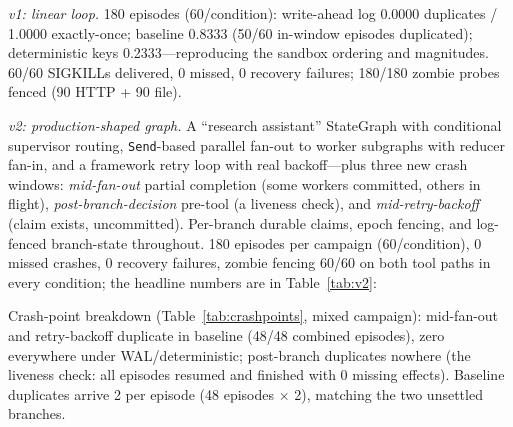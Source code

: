 \documentclass[10pt,journal,compsoc]{IEEEtran}
\begin{document}
\emph{v1: linear loop.} 180 episodes (60/condition):
write-ahead log 0.0000 duplicates / 1.0000 exactly-once;
baseline 0.8333 (50/60 in-window episodes duplicated);
deterministic keys 0.2333---reproducing the sandbox ordering
and magnitudes. 60/60 SIGKILLs delivered, 0 missed, 0 recovery
failures; 180/180 zombie probes fenced (90 HTTP + 90 file).

\emph{v2: production-shaped graph.} A ``research assistant''
StateGraph with conditional supervisor routing, \texttt{Send}-based
parallel fan-out to worker subgraphs with reducer fan-in, and a
framework retry loop with real backoff---plus three new crash
windows: \emph{mid-fan-out} partial completion (some workers
committed, others in flight), \emph{post-branch-decision} pre-tool
(a liveness check), and \emph{mid-retry-backoff} (claim exists,
uncommitted). Per-branch durable claims, epoch fencing, and
log-fenced branch-state throughout. 180 episodes per campaign
(60/condition), 0 missed crashes, 0 recovery failures, zombie
fencing 60/60 on both tool paths in every condition; the
headline numbers are in Table~\ref{tab:v2}:

\begin{table}[ht]
\centering
\caption{LangGraph v2: duplicate / exactly-once rates
(60 episodes/condition). Zero observed duplicates corresponds
to a one-sided exact 95\% upper bound of 4.87\% per condition.}
\label{tab:v2}
\end{table}

Crash-point breakdown (Table~\ref{tab:crashpoints}, mixed campaign): mid-fan-out and
retry-backoff duplicate in baseline (48/48 combined episodes),
zero everywhere under WAL/deterministic; post-branch duplicates
nowhere (the liveness check: all episodes resumed and finished
with 0 missing effects). Baseline duplicates arrive 2 per
episode (48 episodes $\times$ 2), matching the two unsettled
branches.
\end{document}
